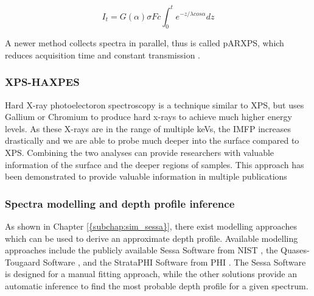 \begin{equation}
\label{intensity_angle}
    I_{t} = G(\alpha)\sigma F c \int_{0}^{t} e^{-z/ \lambda cos \alpha} dz
\end{equation}

A newer method collects spectra in parallel, thus is called pARXPS, which reduces acquisition time and constant transmission \cite{bure_assessing_2023, sodhi_surface_2017}.

\subsubsection{XPS-HAXPES}
Hard X-ray photoelectoron spectroscopy is a technique similar to XPS, but uses Gallium or Chromium to produce hard x-rays to achieve much higher energy levels. As these X-rays are in the range of multiple keVs, the IMFP increases drastically and we are able to probe much deeper into the surface compared to XPS. Combining the two analyses can provide researchers with valuable information of the surface and the deeper regions of samples. This approach has been demonstrated to provide valuable information in multiple publications \cite{bure_assessing_2023, siol_concepts_2020} 

\subsubsection{Spectra modelling and depth profile inference}
As shown in Chapter \ref{{subchap:sim_sessa}}, there exist modelling approaches which can be used to derive an approximate depth profile. Available modelling approaches include the publicly available Sessa Software from NIST \cite{smekal_simulation_2005}, the Quases-Tougaard Software \cite{zborowski_comparison_2022}, and the StrataPHI Software from PHI \cite{noauthor_updated_nodate}. The Sessa Software is designed for a manual fitting approach, while the other solutions provide an automatic inference to find the most probable depth profile for a given spectrum.